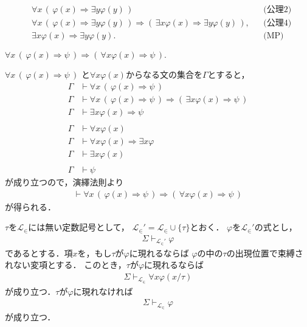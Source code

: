 	\begin{align}
		&\forall x\, \left(\, \varphi(x) \Longrightarrow \exists y \varphi(y)\, \right)
		&& \mbox{(公理2)} \\
		&\forall x\, \left(\, \varphi(x) \Longrightarrow \exists y \varphi(y)\, \right)
		\Longrightarrow \left(\, \exists x \varphi(x) \Longrightarrow \exists y \varphi(y)\, \right),
		&& \mbox{(公理4)} \\
		&\exists x \varphi(x) \Longrightarrow \exists y \varphi(y).
		&& \mbox{(MP)}
	\end{align}
	
	\begin{screen}
		$\forall x\,  \left(\, \varphi(x) \Longrightarrow \psi\, \right)
		\Longrightarrow \left(\, \forall x \varphi(x) \Longrightarrow \psi\, \right).$
	\end{screen}
	
	$\forall x\,  \left(\, \varphi(x) \Longrightarrow \psi\, \right)$
	と$\forall x \varphi(x)$からなる文の集合を$\Gamma$とすると，
	\begin{align}
		\Gamma &\vdash \forall x\,  \left(\, \varphi(x) \Longrightarrow \psi\, \right) \\
		\Gamma &\vdash \forall x\,  \left(\, \varphi(x) \Longrightarrow \psi\, \right) \Longrightarrow \left(\, \exists x \varphi(x) \Longrightarrow \psi\, \right) \\
		\Gamma &\vdash \exists x \varphi(x) \Longrightarrow \psi \\
		& \\
		\Gamma &\vdash \forall x \varphi(x) \\
		\Gamma &\vdash \forall x \varphi(x) \Longrightarrow \exists x \varphi \\
		\Gamma &\vdash \exists x \varphi(x) \\
		& \\
		\Gamma &\vdash \psi
	\end{align}
	が成り立つので，演繹法則より
	\begin{align}
		\vdash \forall x\,  \left(\, \varphi(x) \Longrightarrow \psi\, \right)
		\Longrightarrow \left(\, \forall x \varphi(x) \Longrightarrow \psi\, \right)
	\end{align}
	が得られる．
	
	\begin{screen}
		$\tau$を$\mathcal{L}_{\in}$には無い定数記号として，
		$\mathcal{L}_{\in}' = \mathcal{L}_{\in} \cup \{\tau\}$とおく．
		$\varphi$を$\mathcal{L}_{\in}'$の式とし，
		\begin{align}
			\Sigma \vdash_{\mathcal{L}_{\in}'} \varphi
		\end{align}
		であるとする．項$x$を，もし$\tau$が$\varphi$に現れるならば
		$\varphi$の中の$\tau$の出現位置で束縛されない変項とする．
		このとき，$\tau$が$\varphi$に現れるならば
		\begin{align}
			\Sigma \vdash_{\mathcal{L}_{\in}} \forall x \varphi(x/\tau)
		\end{align}
		が成り立つ．$\tau$が$\varphi$に現れなければ
		\begin{align}
			\Sigma \vdash_{\mathcal{L}_{\in}} \varphi
		\end{align}
		が成り立つ．
	\end{screen}
	
